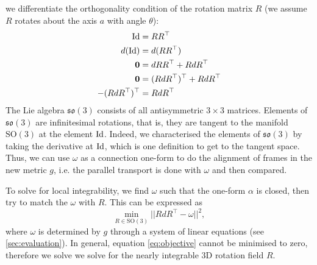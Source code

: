 \documentclass[../thesis.tex]{subfiles}
\begin{document}
we differentiate the orthogonality condition of the rotation matrix $R$ (we assume $R$ rotates about the axis $a$ with angle $\theta$):
\begin{align*}
  \operatorname{Id} &= RR^{\top} \\
  d(\operatorname{Id}) &= d(RR^{\top}) \\
  \bm{0} &= dRR^{\top} + RdR^{\top} \\
  \bm{0} &= (RdR^{\top})^{\top} + RdR^{\top} \\
  -(RdR^{\top})^{\top} &= RdR^{\top}
\end{align*}
The Lie algebra $\mathfrak{so}(3)$ consists of all antisymmetric $3\times3$ matrices.
Elements of $\mathfrak{so}(3)$ are infinitesimal rotations, that is,
they are tangent to the manifold $\mathrm{SO}(3)$ at the element $\operatorname{Id}$.
Indeed, we characterised the elements of $\mathfrak{so}(3)$ by taking the derivative at $\operatorname{Id}$,
which is one definition to get to the tangent space.
Thus, we can use $\omega$ as a connection one-form to do the alignment of frames in
the new metric $g$, i.e. the parallel transport is done with $\omega$ and then compared.

To solve for local integrability, we find $\omega$ such that the one-form $\alpha$ is closed,
then try to match the $\omega$ with $R$. This can be expressed as
\begin{equation}\label{eq:objective}
  \min_{R\in \mathrm{SO}(3)} ||RdR^{\top} - \omega ||^2,
\end{equation}
where $\omega$ is determined by $g$ through a system of linear equations (see \ref{sec:evaluation}).
In general, equation \ref{eq:objective} cannot be minimised to zero, therefore we solve we solve
for the nearly integrable 3D rotation field $R$.
\end{document}
